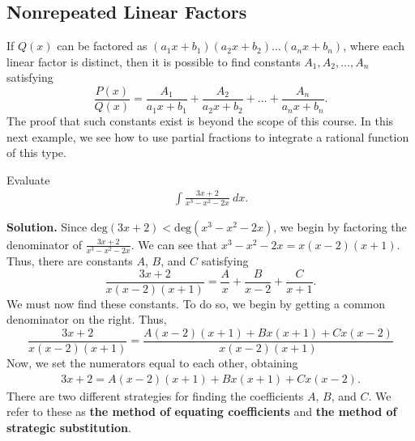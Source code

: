 \documentclass{report}
\begin{document}
    \subsection*{Nonrepeated Linear Factors}
    \bigbreak \noindent 
    If $Q(x)$ can be factored as $(a_1x + b_1)(a_2x + b_2) \dots (a_nx + b_n)$, where each linear factor is distinct, then it is possible to find constants $A_1, A_2, \dots, A_n$ satisfying
    \bigbreak \noindent 
    \[ \frac{P(x)}{Q(x)} = \frac{A_1}{a_1x + b_1} + \frac{A_2}{a_2x + b_2} + \dots + \frac{A_n}{a_nx + b_n}. \]
    \bigbreak \noindent 
    The proof that such constants exist is beyond the scope of this course.
    \bigbreak \noindent 
    In this next example, we see how to use partial fractions to integrate a rational function of this type.
    \bigbreak \noindent 
    \begin{eg}
        Evaluate
        \begin{align*}
            \int \frac{3x+2}{x^{3}-x^{2}-2x}\ dx
        .\end{align*}
        \bigbreak \noindent 
    \end{eg}
    \bigbreak \noindent 
    \textbf{Solution.} Since $\text{deg}(3x+2) < \text{deg}(x^3 - x^2 - 2x)$, we begin by factoring the denominator of $\frac{3x+2}{x^3 - x^2 - 2x}$. We can see that $x^3 - x^2 - 2x = x(x-2)(x+1)$. Thus, there are constants $A$, $B$, and $C$ satisfying
    \[
    \frac{3x+2}{x(x-2)(x+1)} = \frac{A}{x} + \frac{B}{x-2} + \frac{C}{x+1}.
    \]
    \bigbreak \noindent 
    We must now find these constants. To do so, we begin by getting a common denominator on the right. Thus,
    \[ \frac{3x+2}{x(x-2)(x+1)} = \frac{A(x-2)(x+1)+ Bx(x+1)+Cx(x-2)}{x(x-2)(x+1)} \]
        \bigbreak \noindent 
        Now, we set the numerators equal to each other, obtaining
        \begin{align*}
            3x+2=A(x-2)(x+1)+Bx(x+1)+Cx(x-2)
        .\end{align*}
    \bigbreak \noindent 
    There are two different strategies for finding the coefficients  $A$, $B$, and  $C$. We refer to these as \textbf{the method of equating coefficients} and \textbf{the method of strategic substitution}.
\end{document}
